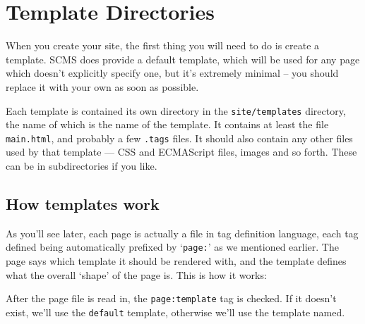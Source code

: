 %
%
%
%
%
%
% 
%
% 
% 
%

\chapter{Template Directories}
\label{templatedirs}
When you create your site, the first thing you will need to do is create a
template. SCMS does provide a default template, which will be used for any
page which doesn't explicitly specify one, but it's extremely minimal -- you
should replace it with your own as soon as possible.

Each template is contained its own directory in the \texttt{site/templates}
directory, the name of which is the name of the template. It contains at least
the file \texttt{main.html}, and probably a few \texttt{.tags} files. It
should also contain any other files used by that template --- CSS and
ECMAScript files, images and so forth. These can be in subdirectories if you
like.

\section{How templates work}
As you'll see later, each page is actually a file in tag definition language, each tag defined being
automatically prefixed by `\texttt{page:}' as we mentioned earlier. The page says which template it
should be rendered with, and the template defines what the overall `shape' of the page is. This is
how it works:

After the page file is read in,
the \texttt{page:template} tag is checked. If it doesn't exist, we'll use the \texttt{default} template,
otherwise we'll use the template named.


